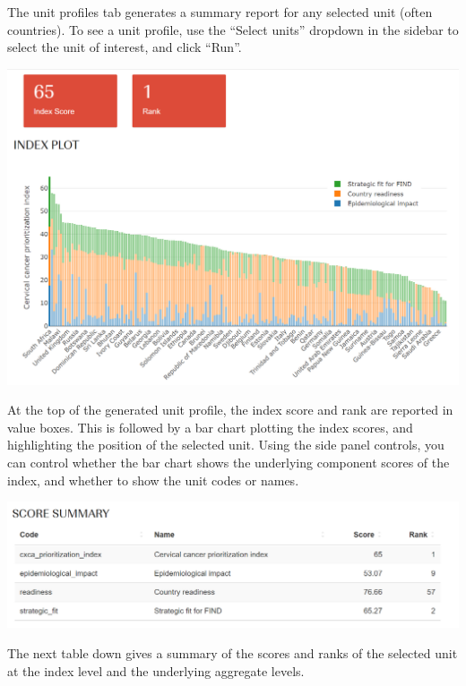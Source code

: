 \documentclass[
  letterpaper,
  DIV=11,
  numbers=noendperiod]{scrreprt}
\begin{document}
The unit profiles tab generates a summary report for any selected unit
(often countries). To see a unit profile, use the ``Select units''
dropdown in the sidebar to select the unit of interest, and click
``Run''.

\includegraphics[width=1\textwidth,height=\textheight]{figs/profiles_1.png}

At the top of the generated unit profile, the index score and rank are
reported in value boxes. This is followed by a bar chart plotting the
index scores, and highlighting the position of the selected unit. Using
the side panel controls, you can control whether the bar chart shows the
underlying component scores of the index, and whether to show the unit
codes or names.

\includegraphics[width=1\textwidth,height=\textheight]{figs/profiles_2.png}

The next table down gives a summary of the scores and ranks of the
selected unit at the index level and the underlying aggregate levels.
\end{document}
